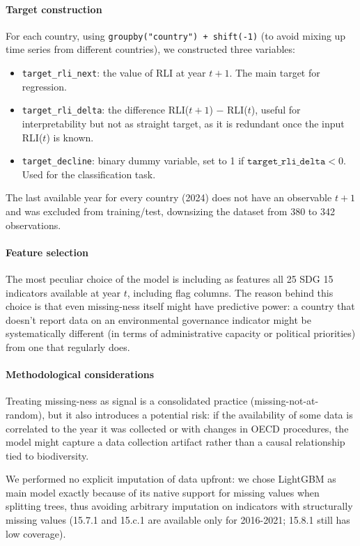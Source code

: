 \paragraph{Target construction} For each country, using \texttt{groupby("country") + shift(-1)} (to avoid mixing up time series from different countries), we constructed three variables:
\begin{itemize}
    \item \texttt{target\_rli\_next}: the value of RLI at year $t + 1$. The main target for regression.
    \item \texttt{target\_rli\_delta}: the difference RLI($t + 1$) $-$ RLI($t$), useful for interpretability but not as straight target, as it is redundant once the input RLI($t$) is known.
    \item \texttt{target\_decline}: binary dummy variable, set to 1 if $\texttt{target\_rli\_delta} < 0$. Used for the classification task.
\end{itemize}
The last available year for every country (2024) does not have an observable $t + 1$ and was excluded from training/test, downsizing the dataset from 380 to 342 observations.

\paragraph{Feature selection} The most peculiar choice of the model is including as features all 25 SDG 15 indicators available at year $t$, including flag columns. The reason behind this choice is that even missing-ness itself might have predictive power: a country that doesn't report data on an environmental governance indicator might be systematically different (in terms of administrative capacity or political priorities) from one that regularly does.

\paragraph{Methodological considerations} Treating missing-ness as signal is a consolidated practice (missing-not-at-random), but it also introduces a potential risk: if the availability of some data is correlated to the year it was collected or with changes in OECD procedures, the model might capture a data collection artifact rather than a causal relationship tied to biodiversity.

We performed no explicit imputation of data upfront: we chose LightGBM as main model exactly because of its native support for missing values when splitting trees, thus avoiding arbitrary imputation on indicators with structurally missing values (15.7.1 and 15.c.1 are available only for 2016-2021; 15.8.1 still has low coverage).

